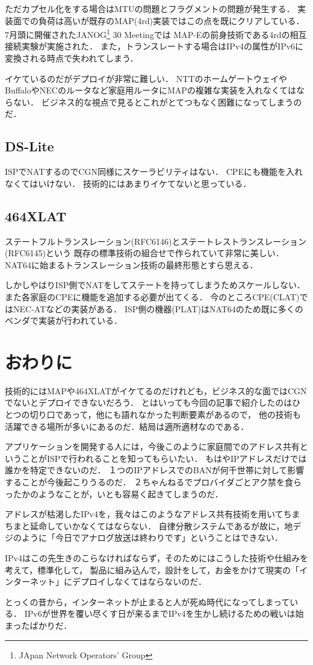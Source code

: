 ただカプセル化をする場合はMTUの問題とフラグメントの問題が発生する．
実装面での負荷は高いが既存のMAP(4rd)実装ではこの点を既にクリアしている．
7月頭に開催されたJANOG\footnote{JApan Network Operators' Group} 30 Meetingでは
MAP-Eの前身技術である4rdの相互接続実験が実施された．
また，トランスレートする場合はIPv4の属性がIPv6に変換される時点で失われてしまう．

イケているのだがデプロイが非常に難しい．
NTTのホームゲートウェイやBuffaloやNECのルータなど家庭用ルータにMAPの複雑な実装を入れなくてはならない．
ビジネス的な視点で見るとこれがとてつもなく困難になってしまうのだ．

\subsection{DS-Lite}
ISPでNATするのでCGN同様にスケーラビリティはない．
CPEにも機能を入れなくてはいけない．
技術的にはあまりイケてないと思っている．

\subsection{464XLAT}
ステートフルトランスレーション(RFC6146)とステートレストランスレーション(RFC6145)という
既存の標準技術の組合せで作られていて非常に美しい．
NAT64に始まるトランスレーション技術の最終形態とすら思える．

しかしやはりISP側でNATをしてステートを持ってしまうためスケールしない．
また各家庭のCPEに機能を追加する必要が出てくる．
今のところCPE(CLAT)ではNEC-ATなどの実装がある．
ISP側の機器(PLAT)はNAT64のため既に多くのベンダで実装が行われている．

\section{おわりに}

技術的にはMAPや464XLATがイケてるのだけれども，ビジネス的な面ではCGNでないとデプロイできないだろう．
とはいっても今回の記事で紹介したのはひとつの切り口であって，他にも語れなかった判断要素があるので，
他の技術も活躍できる場所が多いにあるのだ．結局は適所適材なのである．

アプリケーションを開発する人には，今後このように家庭間でのアドレス共有ということがISPで行われることを知ってもらいたい．
もはやIPアドレスだけでは誰かを特定できないのだ．
１つのIPアドレスでのBANが何千世帯に対して影響することが今後起こりうるのだ．
２ちゃんねるでプロバイダごとアク禁を食らったかのようなことが，いとも容易く起きてしまうのだ．

アドレスが枯渇したIPv4を，我々はこのようなアドレス共有技術を用いてちまちまと延命していかなくてはならない．
自律分散システムであるが故に，地デジのように「今日でアナログ放送は終わりです」ということはできない．

IPv4はこの先生きのこらなければならず，そのためにはこうした技術や仕組みを考えて，標準化して，
製品に組み込んで，設計をして，お金をかけて現実の「インターネット」にデプロイしなくてはならないのだ．

とっくの昔から，インターネットが止まると人が死ぬ時代になってしまっている．
IPv6が世界を覆い尽くす日が来るまでIPv4を生かし続けるための戦いは始まったばかりだ．
